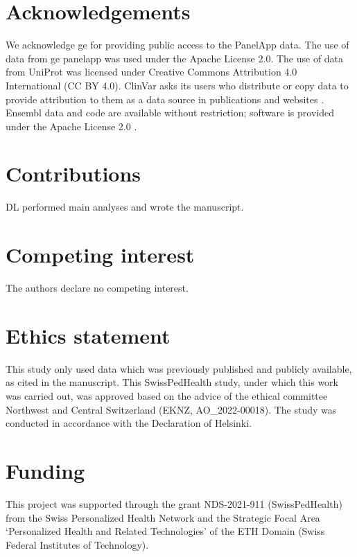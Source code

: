 \section*{Acknowledgements}
\noindent
We acknowledge \ac{ge} for providing public access to the PanelApp data.
The use of data from \ac{ge} panelapp was used under the Apache License 2.0.
The use of data from UniProt was licensed under Creative Commons Attribution 4.0 International (CC BY 4.0).
ClinVar asks its users who distribute or copy data to provide attribution to them as a data source in publications and websites \cite{landrum_clinvar_2018}.
Ensembl data and code are available without restriction; software is provided under the Apache License 2.0 \cite{dyer_ensembl_2025}.

\section*{Contributions}
\noindent 
DL performed main analyses and wrote the manuscript.

\section*{Competing interest}
\noindent
The authors declare no competing interest. 

\section*{Ethics statement}
\noindent
This study only used data which was previously published and publicly available, as cited in the manuscript.
This  SwissPedHealth study, under which this work was carried out, was approved based on the advice of the ethical committee Northwest and Central Switzerland (EKNZ, AO\_2022-00018). 
The study was conducted in accordance with the Declaration of Helsinki.

\section*{Funding}
\noindent This project was supported through the grant NDS-2021-911 (SwissPedHealth) from the Swiss Personalized Health Network and the Strategic Focal Area `Personalized Health and Related Technologies' of the ETH Domain (Swiss Federal Institutes of Technology).

